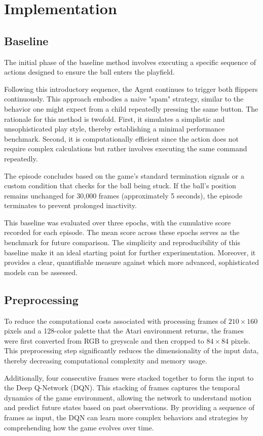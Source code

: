 \documentclass[twocolumn]{webofc}
\begin{document}
\section{Implementation}
\subsection{Baseline}

The initial phase of the baseline method involves executing a specific sequence of actions designed to ensure the ball enters the playfield.

Following this introductory sequence, the Agent continues to trigger both flippers continuously. This approach embodies a naive "spam" strategy, similar to the behavior one might expect from a child repeatedly pressing the same button. The rationale for this method is twofold. First, it simulates a simplistic and unsophisticated play style, thereby establishing a minimal performance benchmark. Second, it is computationally efficient since the action does not require complex calculations but rather involves executing the same command repeatedly.

The episode concludes based on the game’s standard termination signals or a custom condition that checks for the ball being stuck. If the ball's position remains unchanged for 30,000 frames (approximately 5 seconds), the episode terminates to prevent prolonged inactivity.

This baseline was evaluated over three epochs, with the cumulative score recorded for each episode. The mean score across these epochs serves as the benchmark for future comparison. The simplicity and reproducibility of this baseline make it an ideal starting point for further experimentation. Moreover, it provides a clear, quantifiable measure against which more advanced, sophisticated models can be assessed.

\subsection{Preprocessing}
To reduce the computational costs associated with processing frames of \(210 \times 160\) pixels and a 128-color palette that the Atari environment returns, the frames were first converted from RGB to greyscale and then cropped to \(84 \times 84\) pixels. This preprocessing step significantly reduces the dimensionality of the input data, thereby decreasing computational complexity and memory usage. 

Additionally, four consecutive frames were stacked together to form the input to the Deep Q-Network (DQN). This stacking of frames captures the temporal dynamics of the game environment, allowing the network to understand motion and predict future states based on past observations. By providing a sequence of frames as input, the DQN can learn more complex behaviors and strategies by comprehending how the game evolves over time.
\end{document}
